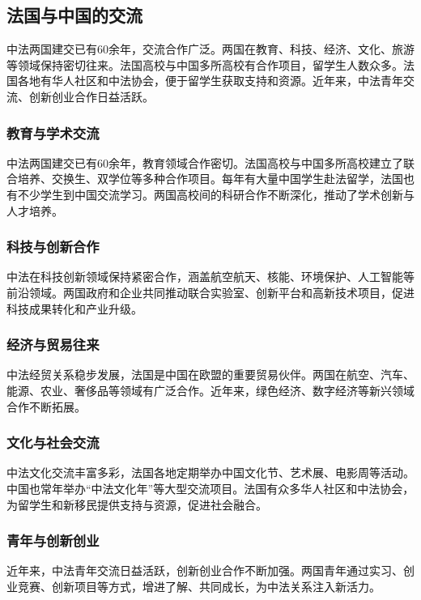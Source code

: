 \subsection{法国与中国的交流}

中法两国建交已有60余年，交流合作广泛。两国在教育、科技、经济、文化、旅游等领域保持密切往来。法国高校与中国多所高校有合作项目，留学生人数众多。法国各地有华人社区和中法协会，便于留学生获取支持和资源。近年来，中法青年交流、创新创业合作日益活跃。

\subsubsection{教育与学术交流}

中法两国建交已有60余年，教育领域合作密切。法国高校与中国多所高校建立了联合培养、交换生、双学位等多种合作项目。每年有大量中国学生赴法留学，法国也有不少学生到中国交流学习。两国高校间的科研合作不断深化，推动了学术创新与人才培养。

\subsubsection{科技与创新合作}

中法在科技创新领域保持紧密合作，涵盖航空航天、核能、环境保护、人工智能等前沿领域。两国政府和企业共同推动联合实验室、创新平台和高新技术项目，促进科技成果转化和产业升级。

\subsubsection{经济与贸易往来}

中法经贸关系稳步发展，法国是中国在欧盟的重要贸易伙伴。两国在航空、汽车、能源、农业、奢侈品等领域有广泛合作。近年来，绿色经济、数字经济等新兴领域合作不断拓展。

\subsubsection{文化与社会交流}

中法文化交流丰富多彩，法国各地定期举办中国文化节、艺术展、电影周等活动。中国也常年举办“中法文化年”等大型交流项目。法国有众多华人社区和中法协会，为留学生和新移民提供支持与资源，促进社会融合。

\subsubsection{青年与创新创业}

近年来，中法青年交流日益活跃，创新创业合作不断加强。两国青年通过实习、创业竞赛、创新项目等方式，增进了解、共同成长，为中法关系注入新活力。

